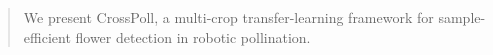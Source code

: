 \begin{abstract}
We present CrossPoll, a multi-crop transfer-learning framework for sample-efficient flower detection in robotic pollination.
\end{abstract}
